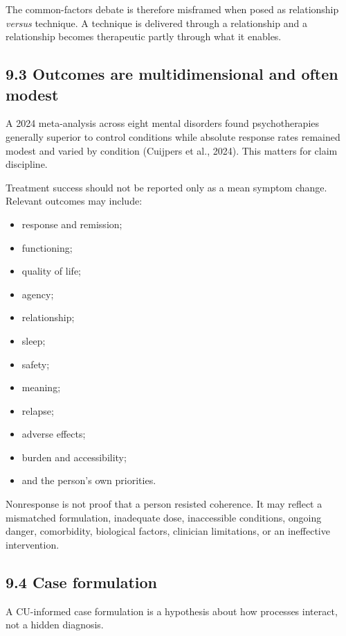 \documentclass[
  11pt,
]{article}
\providecommand{\tightlist}{%
  \setlength{\itemsep}{0pt}\setlength{\parskip}{0pt}}
\begin{document}
The common-factors debate is therefore misframed when posed as
relationship \emph{versus} technique. A technique is delivered through a
relationship and a relationship becomes therapeutic partly through what
it enables.

\subsection{9.3 Outcomes are multidimensional and often
modest}\label{outcomes-are-multidimensional-and-often-modest}

A 2024 meta-analysis across eight mental disorders found psychotherapies
generally superior to control conditions while absolute response rates
remained modest and varied by condition (Cuijpers et al., 2024). This
matters for claim discipline.

Treatment success should not be reported only as a mean symptom change.
Relevant outcomes may include:

\begin{itemize}
\tightlist
\item
  response and remission;
\item
  functioning;
\item
  quality of life;
\item
  agency;
\item
  relationship;
\item
  sleep;
\item
  safety;
\item
  meaning;
\item
  relapse;
\item
  adverse effects;
\item
  burden and accessibility;
\item
  and the person's own priorities.
\end{itemize}

Nonresponse is not proof that a person resisted coherence. It may
reflect a mismatched formulation, inadequate dose, inaccessible
conditions, ongoing danger, comorbidity, biological factors, clinician
limitations, or an ineffective intervention.

\subsection{9.4 Case formulation}\label{case-formulation}

A CU-informed case formulation is a hypothesis about how processes
interact, not a hidden diagnosis.
\end{document}
